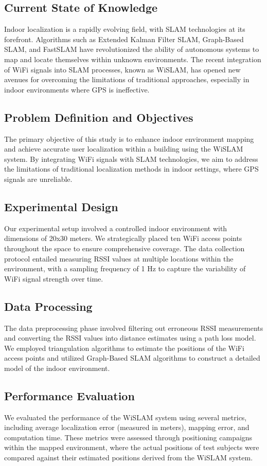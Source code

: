 \documentclass[
	a4paper, %
	11pt, %
	unnumberedsections, %
	twoside, %
]{LTJournalArticle}
\begin{document}
\subsection{Current State of Knowledge}
Indoor localization is a rapidly evolving field, with SLAM technologies at its forefront. Algorithms such as Extended Kalman Filter SLAM, Graph-Based SLAM, and FastSLAM have revolutionized the ability of autonomous systems to map and locate themselves within unknown environments. The recent integration of WiFi signals into SLAM processes, known as WiSLAM, has opened new avenues for overcoming the limitations of traditional approaches, especially in indoor environments where GPS is ineffective.

\subsection{Problem Definition and Objectives}
The primary objective of this study is to enhance indoor environment mapping and achieve accurate user localization within a building using the WiSLAM system. By integrating WiFi signals with SLAM technologies, we aim to address the limitations of traditional localization methods in indoor settings, where GPS signals are unreliable.

\subsection{Experimental Design}
Our experimental setup involved a controlled indoor environment with dimensions of 20x30 meters. We strategically placed ten WiFi access points throughout the space to ensure comprehensive coverage. The data collection protocol entailed measuring RSSI values at multiple locations within the environment, with a sampling frequency of 1 Hz to capture the variability of WiFi signal strength over time.

\subsection{Data Processing}
The data preprocessing phase involved filtering out erroneous RSSI measurements and converting the RSSI values into distance estimates using a path loss model. We employed triangulation algorithms to estimate the positions of the WiFi access points and utilized Graph-Based SLAM algorithms to construct a detailed model of the indoor environment.

\subsection{Performance Evaluation}
We evaluated the performance of the WiSLAM system using several metrics, including average localization error (measured in meters), mapping error, and computation time. These metrics were assessed through positioning campaigns within the mapped environment, where the actual positions of test subjects were compared against their estimated positions derived from the WiSLAM system.
\end{document}
